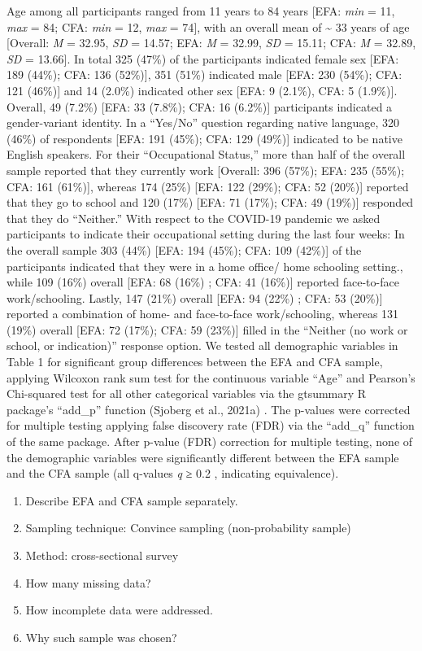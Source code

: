 \documentclass[
  english,
  man]{apa6}
\providecommand{\tightlist}{%
  \setlength{\itemsep}{0pt}\setlength{\parskip}{0pt}}
\begin{document}
Age among all participants ranged from 11 years to 84 years {[}EFA: \emph{min} = 11, \emph{max} = 84; CFA: \emph{min} = 12, \emph{max} = 74{]}, with an overall mean of \textasciitilde{} 33 years of age {[}Overall: \emph{M} = 32.95, \emph{SD} = 14.57; EFA: \emph{M} = 32.99, \emph{SD} = 15.11; CFA: \emph{M} = 32.89, \emph{SD} = 13.66{]}. In total 325 (47\%) of the participants indicated female sex {[}EFA: 189 (44\%); CFA: 136 (52\%){]}, 351 (51\%) indicated male {[}EFA: 230 (54\%); CFA: 121 (46\%){]} and 14 (2.0\%) indicated other sex {[}EFA: 9 (2.1\%), CFA: 5 (1.9\%){]}. Overall, 49 (7.2\%) {[}EFA: 33 (7.8\%); CFA: 16 (6.2\%){]} participants indicated a gender-variant identity. In a ``Yes/No'' question regarding native language, 320 (46\%) of respondents {[}EFA: 191 (45\%); CFA: 129 (49\%){]} indicated to be native English speakers. For their ``Occupational Status,'' more than half of the overall sample reported that they currently work {[}Overall: 396 (57\%); EFA: 235 (55\%); CFA: 161 (61\%){]}, whereas 174 (25\%) {[}EFA: 122 (29\%); CFA: 52 (20\%){]} reported that they go to school and 120 (17\%) {[}EFA: 71 (17\%); CFA: 49 (19\%){]} responded that they do ``Neither.'' With respect to the COVID-19 pandemic we asked participants to indicate their occupational setting during the last four weeks: In the overall sample 303 (44\%) {[}EFA: 194 (45\%); CFA: 109 (42\%){]} of the participants indicated that they were in a home office/ home schooling setting., while 109 (16\%) overall {[}EFA: 68 (16\%) ; CFA: 41 (16\%){]} reported face-to-face work/schooling. Lastly, 147 (21\%) overall {[}EFA: 94 (22\%) ; CFA: 53 (20\%){]} reported a combination of home- and face-to-face work/schooling, whereas 131 (19\%) overall {[}EFA: 72 (17\%); CFA: 59 (23\%){]} filled in the ``Neither (no work or school, or indication)'' response option. We tested all demographic variables in Table 1 for significant group differences between the EFA and CFA sample, applying Wilcoxon rank sum test for the continuous variable ``Age'' and Pearson's Chi-squared test for all other categorical variables via the gtsummary R package's ``add\_p'' function (Sjoberg et al., 2021a) . The p-values were corrected for multiple testing applying false discovery rate (FDR) via the ``add\_q'' function of the same package. After p-value (FDR) correction for multiple testing, none of the demographic variables were significantly different between the EFA sample and the CFA sample (all q-values \emph{q} ≥ 0.2 , indicating equivalence).

\begin{enumerate}
\def\labelenumi{\arabic{enumi}.}
\tightlist
\item
  Describe EFA and CFA sample separately.
\item
  Sampling technique: Convince sampling (non-probability sample)
\item
  Method: cross-sectional survey
\item
  How many missing data?
\item
  How incomplete data were addressed.
\item
  Why such sample was chosen?
\end{enumerate}
\end{document}

